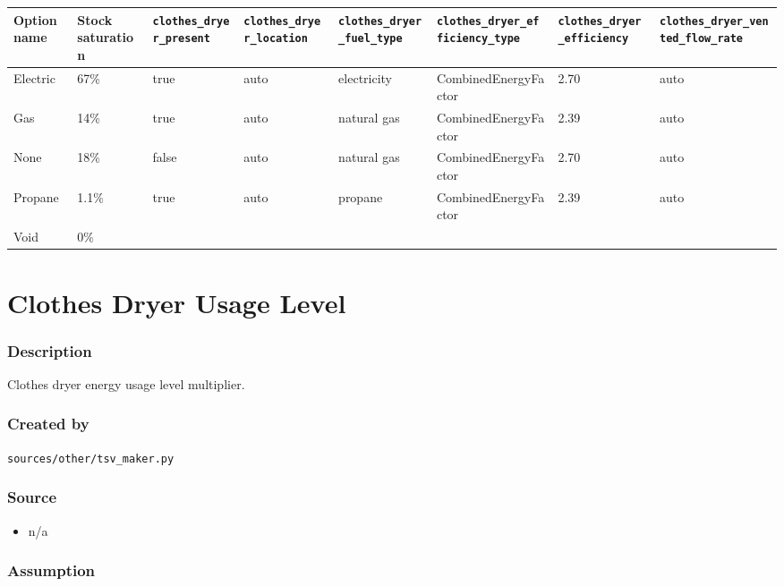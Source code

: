 \begin{longtable}[]{@{}llllllll@{}}
\toprule\noalign{}
Option name & Stock saturation & \texttt{clothes\_dryer\_present} &
\texttt{clothes\_dryer\_location} & \texttt{clothes\_dryer\_fuel\_type}
& \texttt{clothes\_dryer\_efficiency\_type} &
\texttt{clothes\_dryer\_efficiency} &
\texttt{clothes\_dryer\_vented\_flow\_rate} \\
\midrule\noalign{}
\endhead
\bottomrule\noalign{}
\endlastfoot
Electric & 67\% & true & auto & electricity & CombinedEnergyFactor &
2.70 & auto \\
Gas & 14\% & true & auto & natural gas & CombinedEnergyFactor & 2.39 &
auto \\
None & 18\% & false & auto & natural gas & CombinedEnergyFactor & 2.70 &
auto \\
Propane & 1.1\% & true & auto & propane & CombinedEnergyFactor & 2.39 &
auto \\
Void & 0\% & & & & & & \\
\end{longtable}

\section{Clothes Dryer Usage Level}\label{clothes_dryer_usage_level}

\subsubsection{Description}\label{description-16}

Clothes dryer energy usage level multiplier.

\subsubsection{Created by}\label{created-by-16}

\texttt{sources/other/tsv\_maker.py}

\subsubsection{Source}\label{source-16}

\begin{itemize}
 
\item
  n/a
\end{itemize}

\subsubsection{Assumption}\label{assumption-7}

